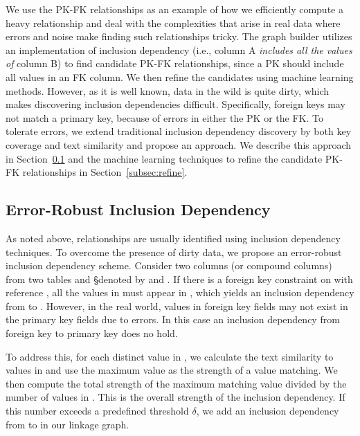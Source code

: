 We use the PK-FK relationships as an example of how we efficiently compute a
heavy relationship and deal with the complexities that arise in real data where
errors and noise make finding such relationships tricky. The graph builder
utilizes an implementation 
of inclusion dependency (i.e., column A {\it includes
all the values of} column B) to find candidate PK-FK relationships, since a PK
should include all values in an FK column. We then refine the candidates using
machine learning methods. However, as it is well known, data in the wild is
quite dirty, which makes discovering inclusion dependencies difficult.
Specifically, foreign keys may not match a primary key, because of errors in
either the PK or the FK. To tolerate errors, we extend traditional inclusion
dependency discovery by both key coverage and text similarity and propose an
\emph{\eind} approach.  We describe this approach in Section~\ref{subsec:eind}
and the machine learning techniques to refine the candidate PK-FK relationships
in Section~\ref{subsec:refine}.

\subsection{Error-Robust Inclusion Dependency}\label{subsec:eind}

As noted above, \pkfk relationships are usually identified using inclusion
dependency techniques. To overcome the presence of dirty data, we propose an
error-robust inclusion dependency scheme.
Consider two columns (or compound columns) from two tables \R and \S denoted by
\RX and \SY. If there is a foreign key constraint on \RX with reference \SY, all
the values in \RX must appear in \SY, which yields an inclusion dependency from
\RX to \SY. However, in the real world, values in foreign key fields may not
exist in the primary key fields due to errors.  In this case an inclusion
dependency from foreign key to primary key does no hold.

To address this, for each distinct value in \RX, we calculate the
text similarity to values in \SY and use the maximum value as the strength of a
value matching. We then compute the total strength of the maximum matching value
divided by the number of values in \RX. This is the overall strength of the
inclusion dependency.  If this number exceeds a predefined threshold $\delta$,
we add an inclusion dependency from \RX to \SY in our linkage graph.

